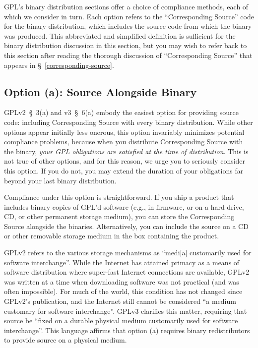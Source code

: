 GPL's binary distribution sections offer a choice of compliance methods,
each of which we consider in turn.  Each option refers to the
``Corresponding Source'' code for the binary distribution, which includes
the source code from which the binary was produced.  This abbreviated and
simplified definition is sufficient for the binary distribution discussion
in this section, but you may wish to refer back to this section after
reading the thorough discussion of ``Corresponding Source'' that appears
in \S~\ref{corresponding-source}.

\subsection{Option (a): Source Alongside Binary}

GPLv2~\S~3(a) and v3~\S~6(a) embody the easiest option for providing
source code: including Corresponding Source with every binary
distribution.  While other options appear initially less onerous, this
option invariably minimizes potential compliance problems, because when
you distribute Corresponding Source with the binary, \emph{your GPL
  obligations are satisfied at the time of distribution}.  This is not
true of other options, and for this reason, we urge you to seriously
consider this option.  If you do not, you may extend the duration of your
obligations far beyond your last binary distribution.

Compliance under this option is straightforward.  If you ship a product
that includes binary copies of GPL'd software (e.g., in firmware, or on a
hard drive, CD, or other permanent storage medium), you can store the
Corresponding Source alongside the binaries.  Alternatively, you can
include the source on a CD or other removable storage medium in the box
containing the product.

GPLv2 refers to the various storage mechanisms as ``medi[a] customarily
used for software interchange''.  While the Internet has attained primacy
as a means of software distribution where super-fast Internet connections
are available, GPLv2 was written at a time when downloading software was
not practical (and was often impossible).  For much of the world, this
condition has not changed since GPLv2's publication, and the Internet
still cannot be considered ``a medium customary for software
interchange''.  GPLv3 clarifies this matter, requiring that source be
``fixed on a durable physical medium customarily used for software
interchange''.  This language affirms that option (a) requires binary
redistributors to provide source on a physical medium.

